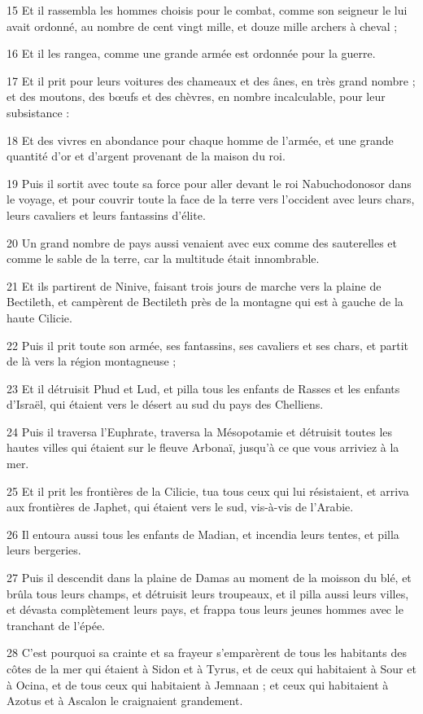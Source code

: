 \par 15 Et il rassembla les hommes choisis pour le combat, comme son seigneur le lui avait ordonné, au nombre de cent vingt mille, et douze mille archers à cheval ;
\par 16 Et il les rangea, comme une grande armée est ordonnée pour la guerre.
\par 17 Et il prit pour leurs voitures des chameaux et des ânes, en très grand nombre ; et des moutons, des bœufs et des chèvres, en nombre incalculable, pour leur subsistance :
\par 18 Et des vivres en abondance pour chaque homme de l'armée, et une grande quantité d'or et d'argent provenant de la maison du roi.
\par 19 Puis il sortit avec toute sa force pour aller devant le roi Nabuchodonosor dans le voyage, et pour couvrir toute la face de la terre vers l'occident avec leurs chars, leurs cavaliers et leurs fantassins d'élite.
\par 20 Un grand nombre de pays aussi venaient avec eux comme des sauterelles et comme le sable de la terre, car la multitude était innombrable.
\par 21 Et ils partirent de Ninive, faisant trois jours de marche vers la plaine de Bectileth, et campèrent de Bectileth près de la montagne qui est à gauche de la haute Cilicie.
\par 22 Puis il prit toute son armée, ses fantassins, ses cavaliers et ses chars, et partit de là vers la région montagneuse ;
\par 23 Et il détruisit Phud et Lud, et pilla tous les enfants de Rasses et les enfants d'Israël, qui étaient vers le désert au sud du pays des Chelliens.
\par 24 Puis il traversa l'Euphrate, traversa la Mésopotamie et détruisit toutes les hautes villes qui étaient sur le fleuve Arbonaï, jusqu'à ce que vous arriviez à la mer.
\par 25 Et il prit les frontières de la Cilicie, tua tous ceux qui lui résistaient, et arriva aux frontières de Japhet, qui étaient vers le sud, vis-à-vis de l'Arabie.
\par 26 Il entoura aussi tous les enfants de Madian, et incendia leurs tentes, et pilla leurs bergeries.
\par 27 Puis il descendit dans la plaine de Damas au moment de la moisson du blé, et brûla tous leurs champs, et détruisit leurs troupeaux, et il pilla aussi leurs villes, et dévasta complètement leurs pays, et frappa tous leurs jeunes hommes avec le tranchant de l'épée.
\par 28 C'est pourquoi sa crainte et sa frayeur s'emparèrent de tous les habitants des côtes de la mer qui étaient à Sidon et à Tyrus, et de ceux qui habitaient à Sour et à Ocina, et de tous ceux qui habitaient à Jemnaan ; et ceux qui habitaient à Azotus et à Ascalon le craignaient grandement.

